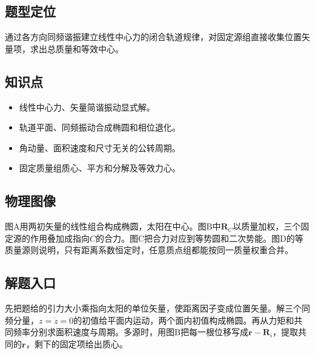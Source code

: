 \documentclass[UTF8,fontset=fandol,a4paper,11pt]{ctexart}
\begin{document}
\subsection*{题型定位}

通过各方向同频谐振建立线性中心力的闭合轨道规律，对固定源组直接收集位置矢量项，求出总质量和等效中心。



\subsection*{知识点}

\begin{itemize}
\item 线性中心力、矢量简谐振动显式解。
\item 轨道平面、同频振动合成椭圆和相位退化。
\item 角动量、面积速度和尺寸无关的公转周期。
\item 固定质量组质心、平方和分解及等效力心。
\end{itemize}



\subsection*{物理图像}

图A用两初矢量的线性组合构成椭圆，太阳在中心。图B中$\boldsymbol R_C$以质量加权，三个固定源的作用叠加成指向$C$的合力。图C把合力对应到等势圆和二次势能。图D的等质量源则说明，只有距离系数恒定时，任意质点组都能按同一质量权重合并。



\subsection*{解题入口}

先把题给的引力大小乘指向太阳的单位矢量，使距离因子变成位置矢量。解三个同频分量，$z=\dot z=0$的初值给平面内运动，两个面内初值构成椭圆。再从力矩和共同频率分别求面积速度与周期。多源时，用图B把每一根位移写成$\boldsymbol r-\boldsymbol R_i$，提取共同的$\boldsymbol r$，剩下的固定项给出质心。

\end{document}
